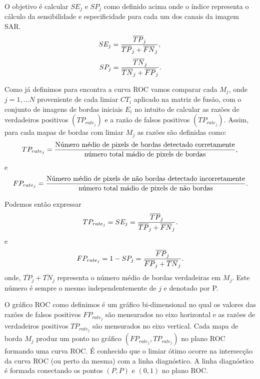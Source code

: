 O objetivo é calcular $SE_j$ e $SP_j$ como definido acima onde o índice representa o cálculo da sensibilidade e especificidade para cada um dos canais da imagem SAR.
\begin{equation}\label{cap_fusao_19}
	SE_j=\frac{\overline{TP}_j}{\overline{TP}_j+\overline{FN}_j}, \\
\end{equation}
\begin{equation}\label{cap_fusao_20}
	SP_j=\frac{\overline{TN}_j}{\overline{TN}_j+\overline{FP}_j}. \\
\end{equation}

Como já definimos para encontra a curva ROC vamos comparar cada $M_j$, onde $j=1,\dots N$ proveniente de cada limiar $CT_i$ aplicado na matriz de fusão, com o conjunto de imagens de bordas iniciais $E_i$ no intuito de calcular as razões de verdadeiros positivos $(TP_{rate_{j}})$ e a razão de falsos positivos $(TP_{rate_{j}})$. Assim, para cada  mapas de bordas com limiar $M_j$ as razões são definidas como:  
\begin{equation}\label{cap_fusao_21}
	TP_{rate_{j}}=\frac{\text{Número médio de pixels de bordas detectado corretamente}}{\text{número total mádio de pixels de bordas}}, \\
\end{equation}
e 
\begin{equation}\label{cap_fusao_22}
	FP_{rate_{j}}=\frac{\text{Número médio de pixels de não bordas detectado incorretamente}}{\text{número total mádio de pixels de não bordas}}. \\
\end{equation}

Podemos então expressar 
\begin{equation}\label{cap_fusao_23}
	TP_{rate_{j}}=SE_j=\frac{\overline{TP}_j}{\overline{TP}_j+\overline{FN}_j}. \\
\end{equation}
e
\begin{equation}\label{cap_fusao_24}
	FP_{rate_{j}}=1 - SP_j=\frac{\overline{FP}_j}{\overline{FP}_j+\overline{TN}_j}. \\
\end{equation}
onde, $\overline{TP}_j+\overline{TN}_j$ representa o número médio de bordas verdadeiras em $M_j$. Este número é sempre o mesmo independentemente de $j$ e denotado por P.

O gráfico ROC como definimos é um gráfico bi-dimensional no qual os valores das razões de falsos positivos $FP_{rate_j}$ são mensurados no eixo horizontal e as razões de verdadeiros positivos $TP_{rate_j}$ são mensurados no eixo vertical. Cada mapa de borda $M_j$ produz um ponto no gráfico $(FP_{rate_j}, TP_{rate_j})$ no plano ROC formando uma curva ROC. É conhecido que o limiar ótimo ocorre na intersecção da curva ROC (ou perto da mesma) com a linha diagnóstico. A linha diagnóstico é formada conectando os pontos $(P,P)$ e $(0,1)$ no plano ROC. 

